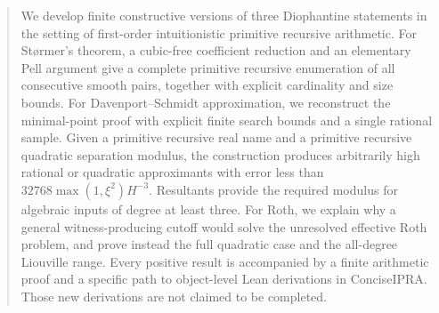 \documentclass[11pt,a4paper]{article}
\theoremstyle{definition}
\theoremstyle{remark}
\begin{document}
\begin{abstract}
We develop finite constructive versions of three Diophantine statements
in the setting of first-order intuitionistic primitive recursive arithmetic.
For St\o rmer's theorem, a cubic-free coefficient reduction and an elementary
Pell argument give a complete primitive recursive enumeration of all
consecutive smooth pairs, together with explicit cardinality and size bounds.
For Davenport--Schmidt approximation, we reconstruct the minimal-point proof
with explicit finite search bounds and a single rational sample.  Given a
primitive recursive real name and a primitive recursive quadratic separation
modulus, the construction produces arbitrarily high rational or quadratic
approximants with error less than
$32768\max(1,\xi^2)H^{-3}$.  Resultants provide the required modulus for
algebraic inputs of degree at least three.  For Roth, we explain why a general
witness-producing cutoff would solve the unresolved effective Roth problem,
and prove instead the full quadratic case and the all-degree Liouville range.
Every positive result is accompanied by a finite arithmetic proof and a
specific path to object-level Lean derivations in ConciseIPRA.  Those new
derivations are not claimed to be completed.
\end{abstract}
\tableofcontents
\clearpage





\clearpage

\end{document}
